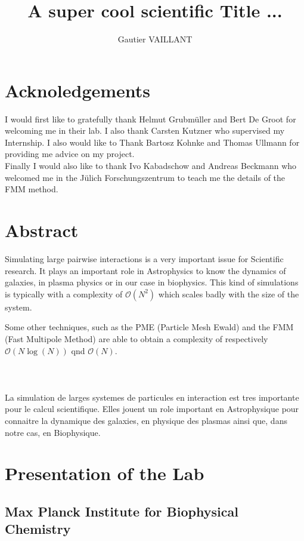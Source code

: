 \documentclass[11pt,twoside,a4paper]{report}
\title{A super cool scientific Title ...}
\author{Gautier VAILLANT}
\begin{document}
\maketitle

\chapter*{Acknoledgements}

I would first like to gratefully thank Helmut Grubmüller and Bert De Groot for welcoming me in their lab. I also thank Carsten Kutzner who supervised my Internship. I also would like to Thank Bartosz Kohnke and Thomas Ullmann for providing me advice on my project.\\ 

Finally I would also like to thank Ivo Kabadschow and Andreas Beckmann who welcomed me in the Jülich Forschungszentrum to teach me the details of the FMM method. 


\chapter*{Abstract}

Simulating large pairwise interactions is a very important issue for Scientific research. It plays an important role in Astrophysics to know the dynamics of galaxies, in plasma physics or in our case in biophysics. This kind of simulations is typically with a complexity of $\mathcal{O}(N^2)$ which scales badly with the size of the system.

Some other techniques, such as the PME (Particle Mesh Ewald) and the FMM (Fast Multipole Method) are able to obtain a complexity of respectively $\mathcal{O}(N\log(N))$ qnd $\mathcal{O}(N)$.
\\
\\
\\
\\

La simulation de larges systemes de particules en interaction est tres importante pour le calcul scientifique. Elles jouent un role important en Astrophysique pour connaitre la dynamique des galaxies, en physique des plasmas ainsi que, dans notre cas, en Biophysique.


\tableofcontents

\chapter{Presentation of the Lab}
\section*{Max Planck Institute for Biophysical Chemistry}
\end{document}

